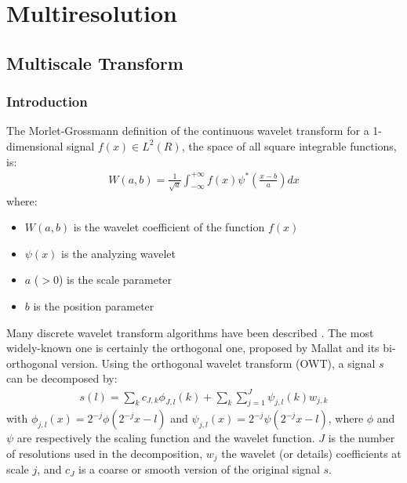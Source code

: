  

\chapter{\proj Multiresolution}
\label{ch_wave}

\section{Multiscale Transform}
\subsection{Introduction}
The Morlet-Grossmann definition \cite{wave:grossmann89}   
of the continuous wavelet
transform for a 1-dimensional signal $f(x)\in L^2(R)$, the space of all
square integrable functions, is:
\begin{eqnarray}
W(a,b)=\frac{1}{\sqrt a}\int_{-\infty}^{+\infty}f(x) \psi^* \left( 
\frac{x-b}{a} \right) dx
\label{eqn_wave}
\end{eqnarray}
where:
\begin{itemize}
\item $W(a,b)$ is the wavelet coefficient of the function $f(x)$
\item $\psi(x)$ is the analyzing wavelet
\item $a$ ($>0$) is the scale parameter
\item $b$ is the position parameter
\end{itemize}
Many discrete wavelet transform algorithms have been described 
\cite{starck:book98}. The most widely-known one  
is certainly the orthogonal one, 
proposed by Mallat \cite{wave:mallat89} and its bi-orthogonal version.
Using the orthogonal wavelet transform (OWT), a signal $s$ can
be decomposed by:
\begin{eqnarray}
 s(l) = \sum_{k} c_{J,k} \phi_{J,l}(k) 
       +  \sum_{k} \sum_{j=1}^J \psi_{j,l}(k) w_{j,k}
\end{eqnarray}
with $\phi_{j,l}(x) = 2^{-j} \phi(2^{-j}x-l)$ and  $\psi_{j,l}(x) = 2^{-j} \psi(2^{-j}x-l)$,
where $\phi$ and $\psi$ are respectively 
the scaling function and the wavelet function. 
$J$ is the number of resolutions used in the decomposition, 
$w_{j}$ the wavelet (or details) coefficients at scale $j$, and
$c_{J}$ is a coarse or smooth version of the original signal $s$.
